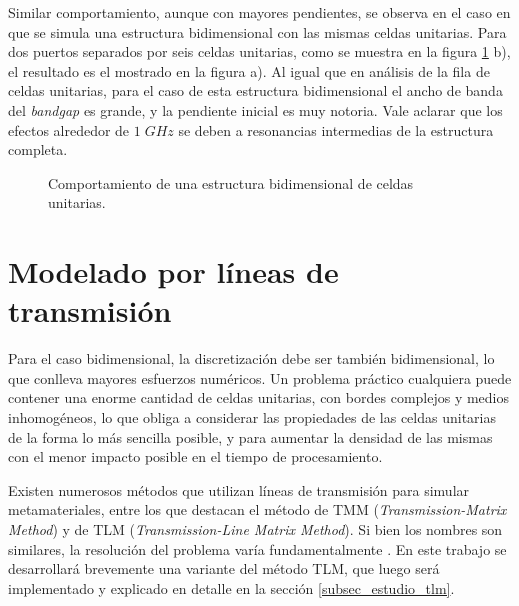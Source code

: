 Similar comportamiento, aunque con mayores pendientes, se observa en el caso en que se simula una estructura bidimensional con las mismas celdas unitarias. Para dos puertos separados por seis celdas unitarias, como se muestra en la figura \ref{fig:s12-estructura2d-super} b), el resultado es el mostrado en la figura a). Al igual que en análisis de la fila de celdas unitarias, para el caso de esta estructura bidimensional el ancho de banda del \textit{bandgap} es grande, y la pendiente inicial es muy notoria. Vale aclarar que los efectos alrededor de $1\; GHz$ se deben a resonancias intermedias de la estructura completa.


\begin{figure}[h]
	\centering 
	\hspace{0pt}
	\caption{Comportamiento de una estructura bidimensional de celdas unitarias.}
	\label{fig:s12-estructura2d-super}	
\end{figure}  



\section{Modelado por líneas de transmisión}

Para el caso bidimensional, la discretización debe ser también bidimensional, lo que conlleva mayores esfuerzos numéricos. Un problema práctico cualquiera puede contener una enorme cantidad de celdas unitarias, con bordes complejos y medios inhomogéneos, lo que obliga a considerar las propiedades de las celdas unitarias de la forma lo más sencilla posible, y para aumentar la densidad de las mismas con el menor impacto posible en el tiempo de procesamiento.

Existen numerosos métodos que utilizan líneas de transmisión para simular metamateriales, entre los que destacan el método de TMM (\textit{Transmission-Matrix Method}) y de TLM (\textit{Transmission-Line Matrix Method}). Si bien los nombres son similares, la resolución del problema varía fundamentalmente \cite{Caloz:ElectromagneticMetamaterials}. En este trabajo se desarrollará brevemente una variante del método TLM, que luego será implementado y explicado en detalle en la sección \ref{subsec_estudio_tlm}.

